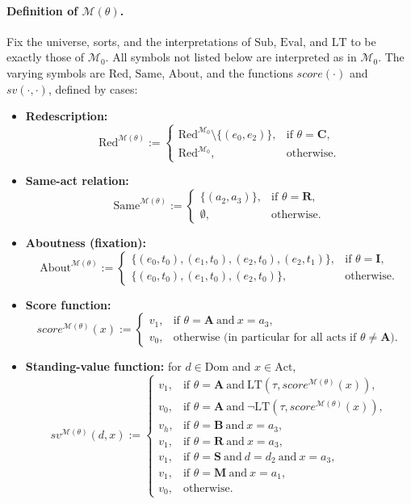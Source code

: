 \documentclass[12pt]{article}
\begin{document}
\paragraph{Definition of \texorpdfstring{$\mathcal{M}(\theta)$}{M(theta)}.}
Fix the universe, sorts, and the interpretations of $\mathrm{Sub}$, $\mathrm{Eval}$, and $\mathrm{LT}$ to be exactly those of $\mathcal{M}_0$.
All symbols not listed below are interpreted as in $\mathcal{M}_0$.
The varying symbols are $\mathrm{Red}$, $\mathrm{Same}$, $\mathrm{About}$, and the functions $score(\cdot)$ and $sv(\cdot,\cdot)$, defined by cases:

\begin{itemize}[leftmargin=2.2em]
\item \textbf{Redescription:}
\[
\mathrm{Red}^{\mathcal{M}(\theta)} :=
\begin{cases}
\mathrm{Red}^{\mathcal{M}_0}\setminus\{(e_0,e_2)\}, & \text{if }\theta=\mathbf{C},\\
\mathrm{Red}^{\mathcal{M}_0}, & \text{otherwise.}
\end{cases}
\]
\item \textbf{Same-act relation:}
\[
\mathrm{Same}^{\mathcal{M}(\theta)} :=
\begin{cases}
\{(a_2,a_3)\}, & \text{if }\theta=\mathbf{R},\\
\emptyset, & \text{otherwise.}
\end{cases}
\]
\item \textbf{Aboutness (fixation):}
\[
\mathrm{About}^{\mathcal{M}(\theta)} :=
\begin{cases}
\{(e_0,t_0),(e_1,t_0),(e_2,t_0),(e_2,t_1)\}, & \text{if }\theta=\mathbf{I},\\
\{(e_0,t_0),(e_1,t_0),(e_2,t_0)\}, & \text{otherwise.}
\end{cases}
\]
\item \textbf{Score function:}
\[
score^{\mathcal{M}(\theta)}(x):=
\begin{cases}
v_1, & \text{if }\theta=\mathbf{A}\ \text{and}\ x=a_3,\\
v_0, & \text{otherwise (in particular for all acts if }\theta\neq \mathbf{A}\text{).}
\end{cases}
\]
\item \textbf{Standing-value function:} for $d\in\mathrm{Dom}$ and $x\in\mathrm{Act}$,
\[
sv^{\mathcal{M}(\theta)}(d,x):=
\begin{cases}
v_1, & \text{if }\theta=\mathbf{A}\ \text{and}\ \mathrm{LT}(\tau,score^{\mathcal{M}(\theta)}(x)),\\
v_0, & \text{if }\theta=\mathbf{A}\ \text{and}\ \neg \mathrm{LT}(\tau,score^{\mathcal{M}(\theta)}(x)),\\[4pt]
v_h, & \text{if }\theta=\mathbf{B}\ \text{and}\ x=a_3,\\
v_1, & \text{if }\theta=\mathbf{R}\ \text{and}\ x=a_3,\\
v_1, & \text{if }\theta=\mathbf{S}\ \text{and}\ d=d_2\ \text{and}\ x=a_3,\\
v_1, & \text{if }\theta=\mathbf{M}\ \text{and}\ x=a_1,\\
v_0, & \text{otherwise.}
\end{cases}
\]
\end{itemize}
\end{document}

